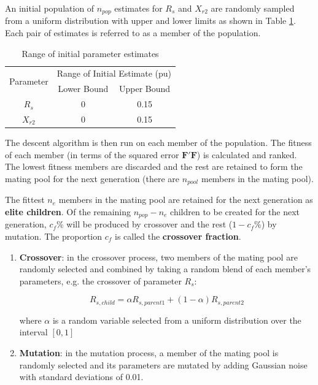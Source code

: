 \documentclass{article}
\begin{document}
An initial population of $n_{pop}$ estimates for $R_s$ and $X_{r2}$ are randomly sampled from a uniform distribution with upper and lower limits as shown in Table \ref{tab:hybridga_range}. Each pair of estimates is referred to as a member of the population.

\begin{table}[!h]
	\renewcommand{\arraystretch}{1.3}
	\begin{center}
	\begin{tabular}{|c|c|c|}
        \hline
		  \multirow{2}{*}{Parameter} & \multicolumn{2}{|c|}{Range of Initial Estimate (pu)} \\ \cline{2-3}
        & Lower Bound & Upper Bound \\ \hline
        $R_{s}$  	& 0  & 0.15	\\ \hline
        $X_{r2}$  	& 0  & 0.15	\\ \hline
    \end{tabular}
	\caption{Range of initial parameter estimates}
	\label{tab:hybridga_range}
	\end{center}
\end{table}

The descent algorithm is then run on each member of the population. The fitness of each member (in terms of the squared error $\mathbf{F}'\mathbf{F}$) is calculated and ranked. The lowest fitness members are discarded and the rest are retained to form the mating pool for the next generation (there are $n_{pool}$ members in the mating pool).

The fittest $n_{e}$ members in the mating pool are retained for the next generation as \textbf{elite children}. Of the remaining $n_{pop} - n_{e}$ children to be created for the next generation, $c_{f}$\% will be produced by crossover and the rest ($1 - c_{f}$\%) by mutation. The proportion $c_{f}$ is called the \textbf{crossover fraction}.

\begin{enumerate}
\item \textbf{Crossover}: in the crossover process, two members of the mating pool are randomly selected and combined by taking a random blend of each member's parameters, e.g. the crossover of parameter $R_{s}$:

\begin{equation}
	R_{s, child} = \alpha R_{s, parent 1} + (1 - \alpha) R_{s, parent 2}
\end{equation}

\noindent where $\alpha$ is a random variable selected from a uniform distribution over the interval $[0,1]$

\item \textbf{Mutation}: in the mutation process, a member of the mating pool is randomly selected and its parameters are mutated by adding Gaussian noise with standard deviations of 0.01.
\end{enumerate}
\end{document}
